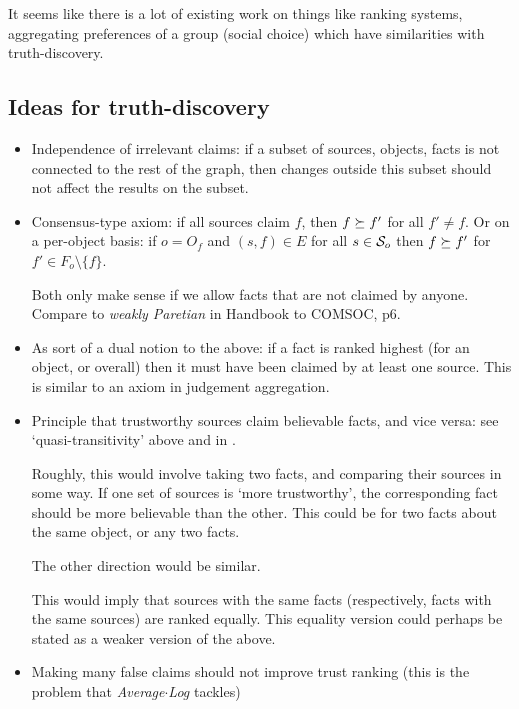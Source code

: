\documentclass[../main.tex]{subfiles}
\begin{document}
It seems like there is a lot of existing work on things like ranking systems,
aggregating preferences of a group (social choice) which have similarities with
truth-discovery.

\subsection{Ideas for truth-discovery}
\begin{itemize}

\item Independence of irrelevant claims: if a subset of sources, objects, facts
is not connected to the rest of the graph, then changes outside this subset
should not affect the results on the subset.

\item Consensus-type axiom: if all sources claim $f$, then $f \fge f'$ for all
$f' \ne f$. Or on a per-object basis: if $o = O_f$ and $(s, f) \in E$ for all
$s \in \S_o$ then $f \fge f'$ for $f' \in F_o \setminus \{f\}$.

Both only make sense if we allow facts that are not claimed by anyone. Compare
to \emph{weakly Paretian} in Handbook to COMSOC, p6.

\item As sort of a dual notion to the above: if a fact is ranked highest (for
an object, or overall) then it must have been claimed by at least one source.
This is similar to an axiom in judgement aggregation. 

\item Principle that trustworthy sources claim believable facts, and vice
versa: see `quasi-transitivity' above and in \cite{altman_personalised}.

Roughly, this would involve taking two facts, and comparing their sources in
some way. If one set of sources is `more trustworthy', the corresponding fact
should be more believable than the other. This could be for two facts about the
same object, or any two facts.

The other direction would be similar.

This would imply that sources with the same facts (respectively, facts with the
same sources) are ranked equally. This equality version could perhaps be
stated as a weaker version of the above.

\item Making many false claims should not improve trust ranking (this is the
problem that \emph{Average${\cdot}$Log} tackles)


\end{itemize}
\end{document}
